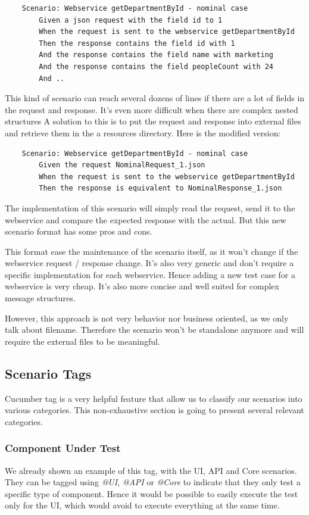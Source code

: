 \begin{verbatim}
    Scenario: Webservice getDepartmentById - nominal case
        Given a json request with the field id to 1
        When the request is sent to the webservice getDepartmentById
        Then the response contains the field id with 1
        And the response contains the field name with marketing
        And the response contains the field peopleCount with 24
        And ..
\end{verbatim}

This kind of scenario can reach several dozens of lines if there are a lot of
fields in the request and response.
It's even more difficult when there are complex nested structures
A solution to this is to put the request and response into external files and
retrieve them in the a resources directory.
Here is the modified version:

\begin{verbatim}
    Scenario: Webservice getDepartmentById - nominal case
        Given the request NominalRequest_1.json
        When the request is sent to the webservice getDepartmentById
        Then the response is equivalent to NominalResponse_1.json
\end{verbatim}

The implementation of this scenario will simply read the request, send it to
the webservice and compare the expected response with the actual.
But this new scenario format has some pros and cons.

This format ease the maintenance of the scenario itself, as it won't change if
the webservice request / response change.
It's also very generic and don't require a specific implementation for each
webservice.
Hence adding a new test case for a webservice is very cheap.
It's also more concise and well suited for complex message structures.

However, this approach is not very behavior nor business oriented, as we only
talk about filename.
Therefore the scenario won't be standalone anymore and will require the
external files to be meaningful.

\subsection{Scenario Tags}\label{subsec:scenario-tags}
Cucumber tag is a very helpful feature that allow us to classify our
scenarios into various categories.
This non-exhaustive section is going to present several relevant categories.

\subsubsection{Component Under Test}
We already shown an example of this tag, with the UI, API and Core scenarios.
They can be tagged using \textit{@UI}, \textit{@API} or \textit{@Core} to
indicate that they only test a specific type of component.
Hence it would be possible to easily execute the test only for the UI, which
would avoid to execute everything at the same time.

